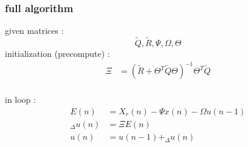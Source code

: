 \documentclass{beamer}
\begin{document}
\begin{frame}
  
  \frametitle{\bf full algorithm}
  given matrices : $$\tilde{Q}, \tilde{R}, \Psi, \Omega, \Theta$$
  initialization (precompute) :
  \begin{align*}
  \Xi &= (\tilde{R} + \Theta^T\tilde{Q}\Theta)^{-1} \Theta^T\tilde{Q} \\
  \end{align*}
  
  in loop :
  \begin{align*}
    E(n) &= X_r(n) - \Psi x(n) - \Omega u(n-1) \\
    _\Delta u(n) &= \Xi E(n) \\
    u(n) &= u(n-1) + _\Delta u(n)
  \end{align*}
\end{frame}
\end{document}
